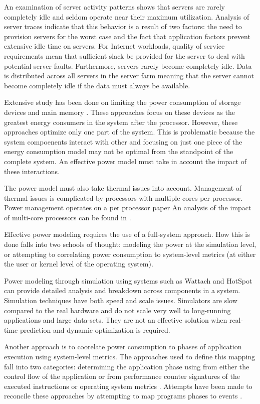 \documentclass[times, 10pt,onecolumn]{article}
\begin{document}
An examination of server activity patterns \cite{Fan2007}\cite{Barroso2007}
shows that servers are rarely completely idle and seldom operate near their
maximum utilization.   Analysis of server traces indicate that this behavior
is a result of two factors: the need to provision servers for the worst case
and the fact that application factors prevent extensive idle time on servers.
For Internet workloads, quality of service requirements mean that sufficient
slack be provided for the server to deal with potential server faults.
Furthermore, servers rarely become completely idle.   Data is distributed
across all servers in the server farm meaning that the server cannot become
completely idle if the data must always be available.  

Extensive study has been done on limiting the power consumption of
storage devices \cite{Pinheiro2004} and main memory \cite{Diniz2007}.
These approaches focus on these devices as the greatest energy consumers
in the system after the processor.  However, these approaches optimize
only one part of the system.  This is problematic because the system
compoenents interact with other and focusing on just one piece of the
energy consumption model may not be optimal from the standpoint of the
complete system.  An effective power model must take in account the
impact of these interactions.

The power model must also take thermal issues into account.  Management
of thermal issues is complicated by processors with multiple cores per
processor.  Power management operates on a per processor paper  An analysis
of the impact of multi-core processors can be found
in \cite{Donald2006}. 

Effective power modeling requires the use of a full-system approach.
How this is done falls into two schools of thought: modeling the power
at the simulation level, or attempting to correlating power consumption
to system-level metrics (at either the user or kernel level of the
operating system).

Power modeling through simulation using systems such as Wattach
\cite{Brooks2000} and HotSpot
\cite{Skadron2004} can provide detailed analysis and breakdown across
components in a system.    Simulation techniques have both speed and
scale issues.  Simulators are slow compared to the real hardware and do
not scale very well to long-running applications and large
data-sets. They are not an effective solution when real-time prediction
and dynamic optimization is required.

Another approach is to coorelate power consumption to phases of
application execution using system-level metrics.  The approaches used
to define this mapping fall into two categories: determining the
application phase using from either the control flow of the application
\cite{Hu2005} \cite{Iyer2001} \cite{Sherwood2003} or from performance
counter signatures of the executed instructions or operating system
metrics \cite{Bellosa2003} \cite{Isci2003a} \cite{Isci2003b}
\cite{Contreras2005} \cite{Economou2006}.  Attempts have been made to
reconcile these approaches by attempting to map programs phases to
events \cite{Isci2006}.
\end{document}
